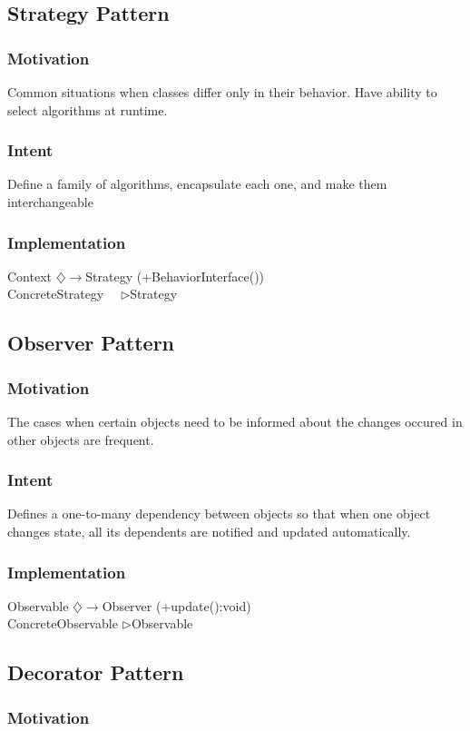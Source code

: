 \documentclass[a4paper]{scrartcl}
\newcommand{\aggregates}{$\diamondsuit\rightarrow $}
\newcommand{\implements}{\textendash ~\textendash ~\textendash$\triangleright$}
\newcommand{\extends}{\textendash\textendash\textendash$\triangleright$}
\begin{document}
    \subsection { Strategy Pattern }
      \subsubsection {Motivation}
        Common situations when classes differ only in their behavior. Have ability to select algorithms at runtime.
      \subsubsection {Intent}
        Define a family of algorithms, encapsulate each one, and make them interchangeable
      \subsubsection { Implementation }
        Context \aggregates Strategy (+BehaviorInterface())\\
        ConcreteStrategy \implements Strategy\\
        
        
    \subsection{Observer Pattern}
      \subsubsection{Motivation}
        The cases when certain objects need to be informed about the changes occured in other objects are frequent.
      \subsubsection{Intent}
        Defines a one-to-many dependency between objects so that when one object changes state, all its dependents are notified and updated automatically.
      \subsubsection{Implementation}
        Observable \aggregates Observer (+update():void)\\
        ConcreteObservable \extends Observable\\
        
        
    \subsection { Decorator Pattern }
      \subsubsection {Motivation}
\end{document}
